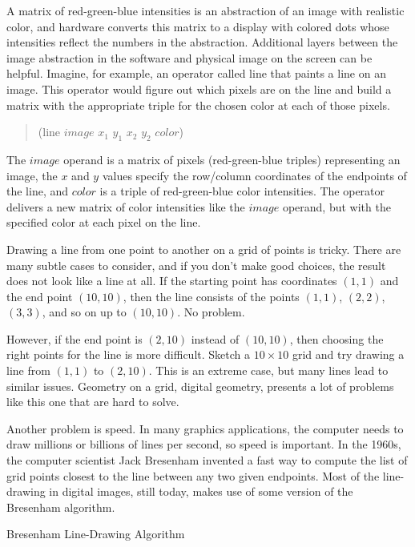 A matrix of red-green-blue
intensities is an abstraction of an image with realistic color,
and hardware converts this matrix to a display with colored dots
whose intensities reflect the numbers in the abstraction.
Additional layers between the image abstraction in the software and 
physical image on the screen can be helpful. 
Imagine, for example, an operator called \textsf{line}
that paints a line on an image. This operator would figure out
which pixels are on the line and build a matrix with
the appropriate triple for the chosen color at each of those pixels.
\begin{quote}
    \textsf{(line} $image$ $x_1$ $y_1$ $x_2$ $y_2$ $color$\textsf{)}
\end{quote}
The $image$ operand is a matrix of pixels (red-green-blue triples)
representing an image, the $x$ and $y$ values
specify the row/column coordinates of the endpoints of the line,
and $color$ is a triple of red-green-blue color intensities.
The operator delivers a new matrix of color intensities
like the $image$ operand, but with the specified color
at each pixel on the line.

\begin{aside}
Drawing a line from one point to another on a grid of points is tricky.
There are many subtle cases to consider, and
if you don't make good choices, the result does not look
like a line at all. If the starting point has
coordinates $(1,1)$ and the end point $(10,10)$,
then the line consists of the points $(1,1)$,
$(2,2)$, $(3,3)$, and so on up to $(10,10)$.
No problem.

However, if the end point is $(2,10)$ instead of $(10,10)$,
then choosing the right points for the line is more difficult.
Sketch a $10\times10$ grid and try drawing a line
from  $(1,1)$ to  $(2,10)$.
This is an extreme case, but many lines lead to similar issues.
Geometry on a grid,
digital geometry,
presents a lot of problems like this one that are hard to solve.

Another problem is speed. In many graphics applications, the
computer needs to draw millions or billions of lines per second,
so speed is important.
In the 1960s, the computer scientist
Jack Bresenham invented
a fast way to compute the list of grid points closest to the line
between any two given endpoints.
Most of the line-drawing in digital images, still today,
makes use of some version of the Bresenham algorithm.
\caption{Bresenham Line-Drawing Algorithm}
\label{aside:Bresenham}
\end{aside}


